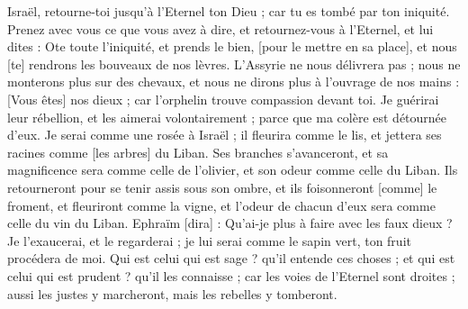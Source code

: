 \begin{multicols}{2}
\VerseOne{}Israël, retourne-toi jusqu'à l'Eternel ton Dieu ; car tu es tombé par ton iniquité.
Prenez avec vous ce que vous avez à dire, et retournez-vous à l'Eternel, et lui dites : Ote toute l'iniquité, et prends le bien, [pour le mettre en sa place], et nous [te] rendrons les bouveaux de nos lèvres.
L'Assyrie ne nous délivrera pas ; nous ne monterons plus sur des chevaux, et nous ne dirons plus à l'ouvrage de nos mains : [Vous êtes] nos dieux ; car l'orphelin trouve compassion devant toi.
Je guérirai leur rébellion, et les aimerai volontairement ; parce que ma colère est détournée d'eux.
Je serai comme une rosée à Israël ; il fleurira comme le lis, et jettera ses racines comme [les arbres] du Liban.
Ses branches s'avanceront, et sa magnificence sera comme celle de l'olivier, et son odeur comme celle du Liban.
Ils retourneront pour se tenir assis sous son ombre, et ils foisonneront [comme] le froment, et fleuriront comme la vigne, et l'odeur de chacun d'eux sera comme celle du vin du Liban.
Ephraïm [dira] : Qu'ai-je plus à faire avec les faux dieux ? Je l'exaucerai, et le regarderai ; je lui serai comme le sapin vert, ton fruit procédera de moi.
Qui est celui qui est sage ? qu'il entende ces choses ; et qui est celui qui est prudent ? qu'il les connaisse ; car les voies de l'Eternel sont droites ; aussi les justes y marcheront, mais les rebelles y tomberont.
\PPE{}
\end{multicols}

